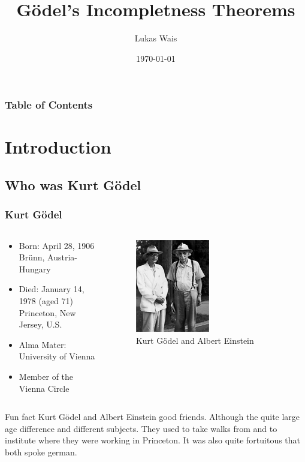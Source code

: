 \documentclass[aspectratio=169]{beamer}
\title{Gödel's Incompletness Theorems}
\author{Lukas Wais}
\institute{Special Topics Course 326.901}
\date{\today}
\begin{document}
\frame{\titlepage}
\begin{frame}[allowframebreaks]
	\frametitle{Table of Contents}
	\tableofcontents
\end{frame}
\section{Introduction}
\subsection{Who was Kurt Gödel}
\begin{frame}[allowframebreaks]
	\frametitle{Kurt Gödel}
	\begin{columns}
		\begin{column}{0.5\textwidth}
   			\begin{itemize}
   				\item Born: April 28, 1906 Brünn, Austria-Hungary
   				\item Died: January 14, 1978 (aged 71) Princeton, New Jersey, U.S.
   				\item Alma Mater: University of Vienna
   				\item Member of the Vienna Circle
   			\end{itemize}
   		\end{column}
		\begin{column}{0.4\textwidth}
			\begin{figure}[h]
				\centering
				\includegraphics[width=0.5\textwidth]{img/godel_albert}
				\caption{Kurt Gödel and Albert Einstein}
			\end{figure}
		\end{column}	
	\end{columns}
	\begin{block}{Fun fact}
		Kurt Gödel and Albert Einstein good friends. Although the quite large age difference and different subjects. They used to take walks from and to institute where they were working in Princeton. It was also quite fortuitous that both spoke german.
	\end{block}
\end{frame}
\end{document}
